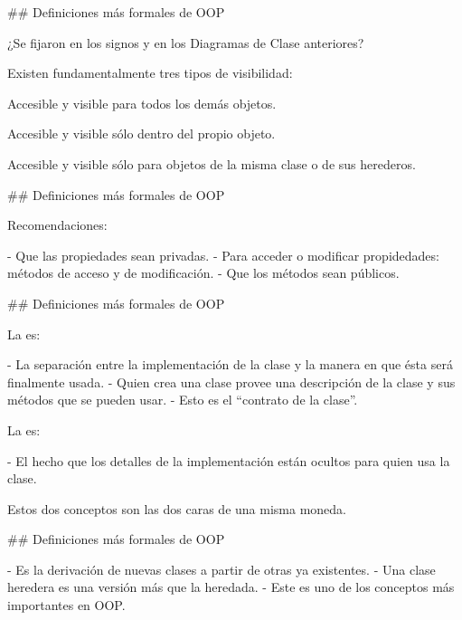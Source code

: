 ## Definiciones más formales de OOP

\newline

¿Se fijaron en los signos \bld{+} y \bld{--} en los Diagramas de Clase anteriores?\newline

Existen fundamentalmente tres tipos de visibilidad:

\begin{description}[leftmargin=3em]
    \item[Pública (+):] Accesible y visible para todos los demás objetos.
    \item[Privada (--):] Accesible y visible sólo dentro del propio objeto.
    \item[Protegida (\#):] Accesible y visible sólo para objetos de la misma clase o de sus herederos.
\end{description}

## Definiciones más formales de OOP

\newline

Recomendaciones:

- Que las propiedades sean privadas.
    - Para acceder o modificar propidedades: métodos de acceso y de modificación.
- Que los métodos sean públicos.

## Definiciones más formales de OOP

\newline

La  es:

- La separación entre la implementación de la clase y la manera en que ésta será
finalmente usada.
- Quien crea una clase provee una descripción de la clase y sus métodos que se pueden
usar.
    - Esto es el ``contrato de la clase''.


La  es:

- El hecho que los detalles de la implementación están ocultos para quien usa la clase.

\vfill

Estos dos conceptos son las dos caras de una misma moneda.

## Definiciones más formales de OOP


- Es la derivación de nuevas clases a partir de otras ya existentes.
- Una clase heredera es una versión más  que la heredada.
- Este es uno de los conceptos más importantes en OOP.


